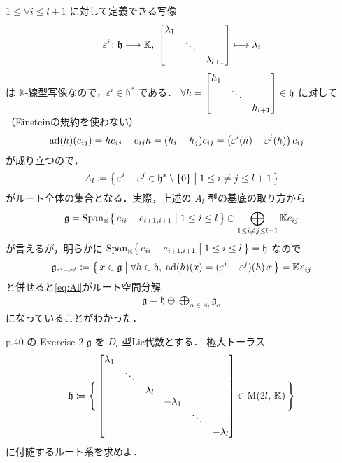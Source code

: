 \documentclass{ltjsarticle}
\theoremstyle{mystyle} %
\numberwithin{equation}{section}
\newcommand{\lto}{\longrightarrow}
\newcommand{\lmto}{\longmapsto}
\begin{document}
$1 \le \forall i \le l+1$ に対して定義できる写像
\begin{align}
    \varepsilon^i \colon \mathfrak{h} \lto \mathbb{K},\; \mqty[\dmat{\lambda_1,\ddots,\lambda_{l+1}}] \lmto \lambda_i
\end{align}
は $\mathbb{K}$-線型写像なので，$\varepsilon^i \in \mathfrak{h}^*$ である．
$\forall h = \mqty[\dmat{h_1,\ddots,h_{l+1}}] \in \mathfrak{h}$ に対して
（Einsteinの規約を使わない）
\begin{align}
    \operatorname{ad}(h)(e_{ij}) &= he_{ij} - e_{ij}h = (h_i - h_j) e_{ij} = \bigl(\varepsilon^i(h) - \varepsilon^j(h)\bigr)\, e_{ij}
\end{align}
が成り立つので，
\begin{align}
    A_l \coloneqq \bigl\{\, \varepsilon^i - \varepsilon^j \in \mathfrak{h}^* \setminus \{0\} \bigm| 1 \le i\neq j \le l+1\,\bigr\} 
\end{align}
がルート全体の集合となる．実際，上述の $A_l$ 型の基底の取り方から
\begin{align}
    \label{eq:Al}
    \mathfrak{g} = \operatorname{Span}_{\mathbb{K}} \bigl\{\, e_{ii} - e_{i+1,i+1} \bigm| 1\le i \le l \,\bigr\} \oplus \bigoplus_{1 \le i \neq j \le l+1} \mathbb{K}e_{ij}
\end{align}
が言えるが，明らかに $\operatorname{Span}_{\mathbb{K}} \bigl\{\, e_{ii} - e_{i+1,i+1} \bigm| 1\le i \le l \,\bigr\} = \mathfrak{h}$ なので
\begin{align}
    \mathfrak{g}_{\varepsilon^i - \varepsilon^j} \coloneqq \bigl\{\, x \in \mathfrak{g} \bigm| \forall h \in \mathfrak{h},\; \operatorname{ad}(h)(x) = (\varepsilon^{i} - \varepsilon^{j})(h)\, x \,\bigr\} = \mathbb{K}e_{ij}
\end{align}
と併せると\eqref{eq:Al}がルート空間分解
\begin{align}
    \mathfrak{g} = \mathfrak{h} \oplus \bigoplus_{\alpha \in A_l} \mathfrak{g}_{\alpha}
\end{align}
になっていることがわかった．

\begin{myproblem}[label=ex:2-8-2D]{p.40 の Exercise 2}
    $\mathfrak{g}$ を $D_l$ 型Lie代数とする．
    極大トーラス
    \begin{align}
        \mathfrak{h} \coloneqq \Biggl\{\, \mqty[\dmat{\lambda_1,\ddots,\lambda_{l},-\lambda_{1},\ddots,-\lambda_{l}}] \in \Mat{2l}{\mathbb{K}} \,\Biggr\} 
    \end{align}
    に付随するルート系を求めよ．
\end{myproblem}
\end{document}
